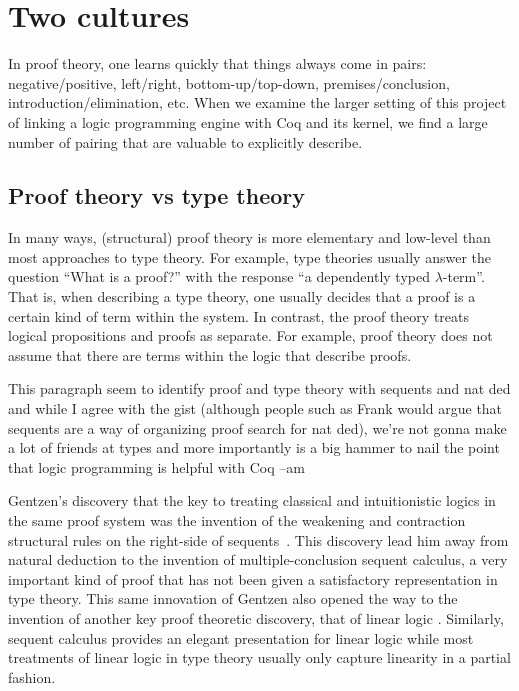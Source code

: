 \section{Two cultures}

In proof theory, one learns quickly that things always come in pairs:
negative/positive, left/right, bottom-up/top-down,
premises/conclusion, introduction/elimination,
etc.
%
When we examine the larger setting of this project of linking a logic
programming engine with Coq and its kernel, we find a large number of
pairing that are valuable to explicitly describe.

\subsection{Proof theory vs type theory}

In many ways, (structural) proof theory is more elementary and
low-level than most approaches to type theory.  For example, type
theories usually answer the question ``What is a proof?'' with the
response ``a dependently typed $\lambda$-term''.  That is, when
describing a type theory, one usually decides that a proof is a
certain kind of term within the system.  In contrast, the proof theory
treats logical propositions and proofs as separate.  For example,
proof theory does not assume that there are terms within the logic
that describe proofs.

\begin{metanote}
  This paragraph seem to identify proof and type theory with sequents and nat ded and while
  I agree with the gist (although people such as Frank would argue that sequents are a way of organizing proof search for nat ded), we're not gonna make a lot of friends at types and more importantly is a big hammer to nail the point that logic programming is helpful with Coq --am 
\end{metanote}

Gentzen's discovery that the key to treating classical and
intuitionistic logics in the same proof system was the invention of
the weakening and contraction structural rules on the right-side of
sequents~\cite{gentzen35}.  This discovery lead him away from natural
deduction to the invention of multiple-conclusion sequent calculus, a
very important kind of proof that has not been given a satisfactory
representation in type theory.  This same innovation of Gentzen also
opened the way to the invention of another key proof theoretic
discovery, that of linear logic \cite{girard87tcs}.
Similarly, sequent calculus provides an elegant presentation for
linear logic while most treatments of linear logic in type theory
usually only capture linearity in a partial fashion.

